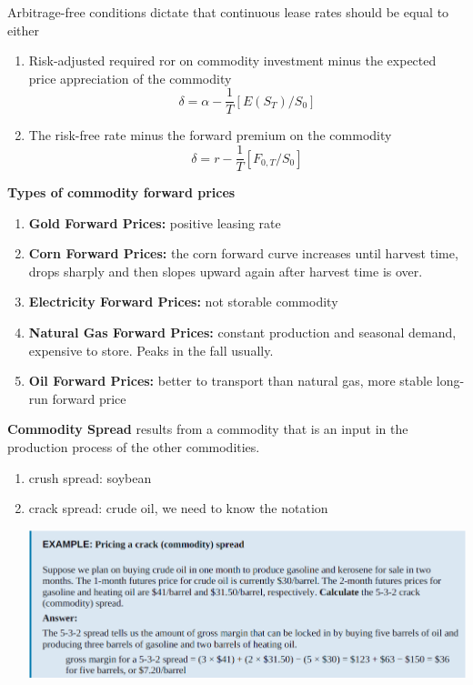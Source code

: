 \documentclass[11pt,fleqn]{report} %
\numberwithin{equation}{section} %
\numberwithin{figure}{section} %
\numberwithin{table}{section} %
\begin{document}
 \begin{remark}Arbitrage-free conditions dictate that continuous lease rates should be equal to either
 
 \begin{enumerate}
     \item Risk-adjusted required ror on commodity investment minus the expected price appreciation of the commodity
     $$
     \delta=\alpha-\frac{1}{T}[E(S_T)/S_0]
     $$
     \item The risk-free rate minus the forward premium on the commodity
     $$
     \delta=r-\frac{1}{T}[F_{0,T}/S_0]
     $$
 \end{enumerate}
  \end{remark}
 \begin{definition}\textbf{Types of commodity forward prices}
 \begin{enumerate}
     \item \textbf{Gold Forward Prices:} positive leasing rate
     \item \textbf{Corn Forward Prices:} the corn forward curve increases until harvest time, drops sharply and then slopes upward again after harvest time is over.
     \item \textbf{Electricity Forward Prices:} not storable commodity
     \item \textbf{Natural Gas Forward Prices:} constant production and seasonal demand, expensive to store. Peaks in the fall usually.
     \item \textbf{Oil Forward Prices:} better to transport than natural gas, more stable long-run forward price
 \end{enumerate}
 \end{definition}
\begin{definition}\textbf{Commodity Spread} results from a commodity that is an input in the production process of the other commodities.
\begin{enumerate}
    \item crush spread: soybean
    \item crack spread: crude oil, we need to know the notation
    \begin{center}
        \includegraphics[scale=0.5]{gasoline.PNG}
    \end{center}
\end{enumerate}
\end{definition}
\end{document}
